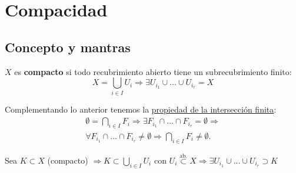 \chapter{Compacidad}%
\label{cha:compacidad}
\section{Concepto y mantras}%
\label{sec:concepto_y_mantras_comp}
\begin{defi}
$X$ es \textbf{compacto} si todo recubrimiento abierto tiene un subrecubrimiento finito:
\[
X = \bigcup_{i \in  I} U_i \Rightarrow \exists U_{i_1} \cup \ldots \cup U_{i_r} = X
\]
\end{defi}

\begin{obs}
Complementando lo anterior tenemos la \underline{propiedad de la intersección finita}: 
\begin{gather*}
    \emptyset = \bigcap_{i \in I} F_i \Rightarrow \exists F_{i_1} \cap \ldots \cap F_{i_r} = \emptyset \Rightarrow\\
    \boxed{    \forall F_{i_1} \cap \ldots \cap F_{i_r} \neq \emptyset \Rightarrow \bigcap_{i \in  I} F_i \neq \emptyset}
.\end{gather*}
\end{obs}

\begin{prop}[Subespacios]
Sea $K \subset X$ (compacto) $\Rightarrow K \subset \bigcup_{i \in  I} U_i$ con $U_i \stackrel{\text{ab.}}{\subset} X \Rightarrow \exists U_{i_1} \cup \ldots \cup U_{i_r} \supset K$
\end{prop}

